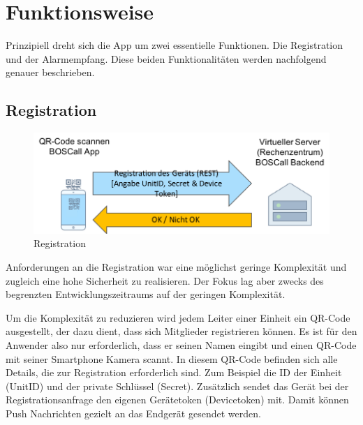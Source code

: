 \section{Funktionsweise}
\label{sec:funktionsweise}
Prinzipiell dreht sich die App um zwei essentielle Funktionen. Die Registration und der Alarmempfang. Diese beiden Funktionalitäten werden nachfolgend genauer beschrieben.
\subsection{Registration}
\begin{figure}[htbp]
	\centering
	\includegraphics[width=\linewidth]{include/img/registration}
	\caption{Registration}
	\label{fig:registration}
\end{figure}
Anforderungen an die Registration war eine möglichst geringe Komplexität und zugleich eine hohe Sicherheit zu realisieren. Der Fokus lag aber zwecks des begrenzten Entwicklungszeitraums auf der geringen Komplexität.

Um die Komplexität zu reduzieren wird jedem Leiter einer Einheit ein QR-Code ausgestellt, der dazu dient, dass sich Mitglieder registrieren können. Es ist für den Anwender also nur erforderlich, dass er seinen Namen eingibt und einen QR-Code mit seiner Smartphone Kamera scannt. In diesem QR-Code befinden sich alle Details, die zur Registration erforderlich sind. Zum Beispiel die ID der Einheit (UnitID) und der private Schlüssel (Secret). Zusätzlich sendet das Gerät bei der Registrationsanfrage den eigenen Gerätetoken (Devicetoken) mit. Damit können Push Nachrichten gezielt an das Endgerät gesendet werden.

